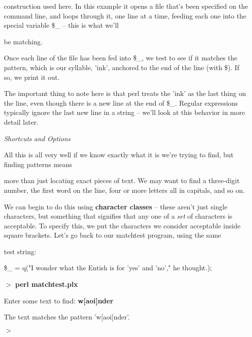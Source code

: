 \documentclass[a4paper,11pt]{book}
\begin{document}
\noindent construction used here. In this example it opens a file that's been specified on the command line, and loops through it, one line at a time, feeding each one into the special variable   \$\_   -- this is what we'll

\noindent be matching.

\noindent 

\noindent Once each line of the file has been fed into \$\_, we test to see if it matches the pattern, which is our syllable, 'ink', anchored to the end of the line (with \$). If so, we print it out.

\noindent 

\noindent The important thing to note here is that perl treats the 'ink' as the last thing on the line, even though there is a new line at the end of \$\_. Regular expressions typically ignore the last new line in a string -- we'll look at this behavior in more detail later.

\noindent 

\noindent \textit{Shortcuts and Options}

\noindent All this is all very well if we know exactly what it is we're trying to find, but finding patterns means

\noindent more than just locating exact pieces of text. We may want to find a three-digit number, the first word on the line, four or more letters all in capitals, and so on.

\noindent 

\noindent We can begin to do this using \textbf{character classes }-- these aren't just single characters, but something that signifies that any one of a \textit{set }of characters is acceptable. To specify this, we put the characters we consider acceptable inside square brackets. Let's go back to our matchtest program, using the same

\noindent test string:

\noindent 

\noindent \$\_  = q("I wonder what the Entish is for 'yes' and 'no'," he thought.);

\noindent 

\noindent $>$ \textbf{perl matchtest.plx}

\noindent Enter some text to find: \textbf{w[aoi]nder}

\noindent The text matches the pattern 'w[aoi]nder'.

\noindent $>$

\noindent 
\end{document}
